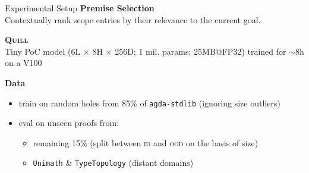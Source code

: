 \documentclass[aspectratio=169]{beamer}
\newcommand{\light}[1]{\textcolor{light}{#1}}
\newcommand\agdaQuill{\textsc{Quill}}
\begin{document}
\begin{frame}{Experimental Setup}
	\smaller
	\textbf{Premise Selection}\\
	Contextually rank scope entries by their relevance to the current goal.\vfill
	
		\textbf{\agdaQuill} \\
	Tiny PoC model (\light{6L $\times$ 8H $\times$ 256D; 1 mil. params; 25MB@FP32}) trained for $\sim$8h on a V100\vfill
	
	\textbf{Data}
	\begin{itemize}
		\item train on random holes from 85\% of \texttt{agda-stdlib} (ignoring size outliers)
		\item eval on unseen proofs from:\vspace{-0.15em}
		\begin{itemize}
			\item remaining 15\% (split between \textsc{id} and \textsc{ood} on the basis of size)
			\item \texttt{Unimath} \& \texttt{TypeTopology} (distant domains)
		\end{itemize}
	\end{itemize}
\end{frame}
\end{document}
